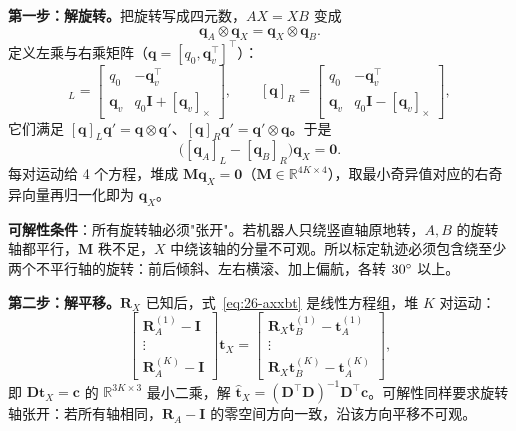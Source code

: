 \textbf{第一步：解旋转。}把旋转写成四元数，$AX=XB$ 变成
\begin{equation}
\bm{q}_A\otimes\bm{q}_X=\bm{q}_X\otimes\bm{q}_B.
\label{eq:26-quat}
\end{equation}
定义左乘与右乘矩阵（$\bm{q}=[q_0,\bm{q}_v^{\top}]^{\top}$）：
\begin{equation}
[\bm{q}]_L=\begin{bmatrix}q_0&-\bm{q}_v^{\top}\\ \bm{q}_v&q_0\bm{I}+[\bm{q}_v]_{\times}\end{bmatrix},\qquad
[\bm{q}]_R=\begin{bmatrix}q_0&-\bm{q}_v^{\top}\\ \bm{q}_v&q_0\bm{I}-[\bm{q}_v]_{\times}\end{bmatrix},
\end{equation}
它们满足 $[\bm{q}]_L\bm{q}'=\bm{q}\otimes\bm{q}'$、$[\bm{q}]_R\bm{q}'=\bm{q}'\otimes\bm{q}$。于是
\begin{equation}
\bigl([\bm{q}_A]_L-[\bm{q}_B]_R\bigr)\bm{q}_X=\bm{0}.
\label{eq:26-quatlinear}
\end{equation}
每对运动给 4 个方程，堆成 $\bm{M}\bm{q}_X=\bm{0}$（$\bm{M}\in\mathbb{R}^{4K\times4}$），取最小奇异值对应的右奇异向量再归一化即为 $\bm{q}_X$。

\textbf{可解性条件}：所有旋转轴必须"张开"。若机器人只绕竖直轴原地转，$A,B$ 的旋转轴都平行，$\bm{M}$ 秩不足，$X$ 中绕该轴的分量不可观。所以标定轨迹必须包含绕至少两个不平行轴的旋转：前后倾斜、左右横滚、加上偏航，各转 $30^\circ$ 以上。

\textbf{第二步：解平移。}$\bm{R}_X$ 已知后，式~\eqref{eq:26-axxbt} 是线性方程组，堆 $K$ 对运动：
\begin{equation}
\begin{bmatrix}\bm{R}_A^{(1)}-\bm{I}\\ \vdots\\ \bm{R}_A^{(K)}-\bm{I}\end{bmatrix}\bm{t}_X
=\begin{bmatrix}\bm{R}_X\bm{t}_B^{(1)}-\bm{t}_A^{(1)}\\ \vdots\\ \bm{R}_X\bm{t}_B^{(K)}-\bm{t}_A^{(K)}\end{bmatrix},
\label{eq:26-tls}
\end{equation}
即 $\bm{D}\bm{t}_X=\bm{c}$ 的 $\mathbb{R}^{3K\times3}$ 最小二乘，解 $\hat{\bm{t}}_X=(\bm{D}^{\top}\bm{D})^{-1}\bm{D}^{\top}\bm{c}$。可解性同样要求旋转轴张开：若所有轴相同，$\bm{R}_A-\bm{I}$ 的零空间方向一致，沿该方向平移不可观。

